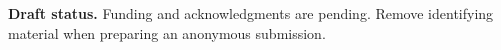 \documentclass[sigconf]{acmart}
\begin{document}
\maketitle









\begin{acks}
\textbf{Draft status.} Funding and acknowledgments are pending. Remove
identifying material when preparing an anonymous submission.
\end{acks}



\end{document}
